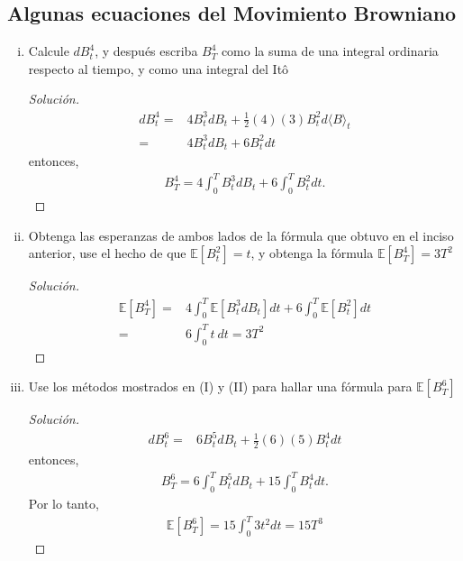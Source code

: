 \documentclass[11pt,notitlepage]{article}
\begin{document}
\subsection{Algunas ecuaciones del Movimiento Browniano}
\begin{enumerate}[i.]
    \item Calcule \(dB_t^4\), y después escriba \(B_T^4\) como la suma de una integral ordinaria respecto al tiempo, y como una integral del Itô
    \begin{proof}[Solución]
    \begin{align*}
        dB_t^4=& 4B_t^3dB_t+\frac{1}{2}(4)(3)B_t^2d\langle B\rangle_t\\
        =& 4B_t^3dB_t+6B_t^2dt
    \end{align*}
    entonces,
    \begin{align*}
        B_T^4=4\int_0^T B_t^3dB_t+6\int_0^TB_t^2dt.
    \end{align*}
    \end{proof}
    \item Obtenga las esperanzas de ambos lados de la fórmula que obtuvo en el inciso anterior, use el hecho de que \(\mathbb{E}\left[B_t^2\right]=t\), y obtenga la fórmula \(\mathbb{E}\left[B_T^4\right]=3T^2\)
     \begin{proof}[Solución]
    \begin{align*}
        \mathbb{E}\left[B_T^4\right]=& 4\int_0^T\mathbb{E}\left[B_t^3dB_t\right]dt+6\int_0^T\mathbb{E}\left[B_t^2\right]dt\\
        =& 6\int_0^Tt~dt
        =3T^2
    \end{align*}
    \end{proof}
    \item Use los métodos mostrados en (I) y (II) para hallar una fórmula para \(\mathbb{E}\left[B_T^6\right]\)
     \begin{proof}[Solución]
    \begin{align*}
        dB_t^6=& 6B_t^5dB_t+\frac{1}{2}(6)(5)B_t^4dt
    \end{align*}
    entonces,
    \begin{align*}
        B_T^6=6\int_0^TB_t^5dB_t+15\int_0^TB_t^4dt.
    \end{align*}
    Por lo tanto,
    \begin{align*}
        \mathbb{E}\left[B_T^6\right]=15\int_0^T3t^2dt=15T^3
    \end{align*}
    \end{proof}
\end{enumerate}
\end{document}
